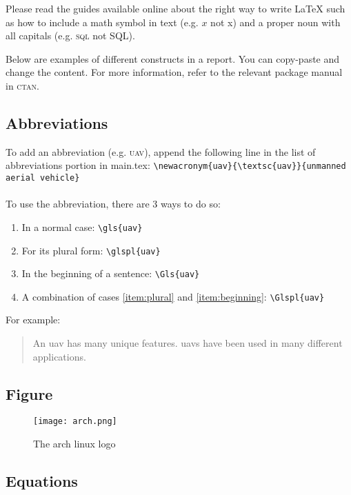\documentclass[../main.tex]{subfiles}
\begin{document}
Please read the guides available online about the right way
to write {\LaTeX} such as how to include a math symbol in
text (e.g. $x$ not x) and a proper noun with all capitals
(e.g. \textsc{sql} not SQL).

Below are examples of different constructs in a report. You
can copy-paste and change the content. For more information,
refer to the relevant package manual in \textsc{ctan}.

\subsection{Abbreviations}

To add an abbreviation (e.g. \textsc{uav}), 
append the following line 
in the list of abbreviations portion in main.tex:
\verb|\newacronym{uav}{\textsc{uav}}{unmanned aerial vehicle}|
\\\\
\noindent
To use the abbreviation, there are 3 ways to do so:
\begin{enumerate}
    \item In a normal case: \verb|\gls{uav}|
    \item\label{item:plural} For its plural form: \verb|\glspl{uav}|
    \item\label{item:beginning} In the beginning of a sentence: \verb|\Gls{uav}|
    \item A combination of cases \ref{item:plural} 
        and \ref{item:beginning}: \verb|\Glspl{uav}|
\end{enumerate}

\noindent
For example:
\begin{quotation}
    \noindent
    An \gls{uav} has many unique features. 
    \Glspl{uav} have been used in many different applications.
\end{quotation}

\subsection{Figure}

\begin{figure}[h] 
    \centering
    \texttt{[image: arch.png]} 
    \caption{The arch linux logo} \label{fig:arch-linux} 
\end{figure}

\subsection{Equations}
\end{document}

